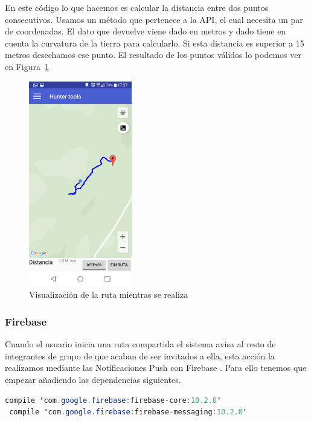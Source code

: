 En este código lo que hacemos es calcular la distancia entre dos puntos consecutivos. Usamos un método que pertenece a la API,  el cual necesita un par de coordenadas. El dato que devuelve viene dado en metros y  dado tiene en cuenta la curvatura de la tierra para calcularlo. Si esta distancia es superior a 15 metros desechamos ese punto. El resultado de los puntos válidos lo podemos ver en  Figura~\ref{fig:individual-navegacion2}

\begin{figure}
		\centering
		\includegraphics[width=0.4\textwidth] {capturamovil/individual-navegacion.png}
		\caption{Visualización de la ruta mientras se realiza}
		\label{fig:individual-navegacion2}
	\end{figure}
	
\subsubsection{Firebase} 
Cuando el usuario inicia una ruta compartida el sistema avisa al resto de integrantes de grupo de que acaban de ser invitados a ella, esta acción la realizamos mediante las Notificaciones Push con Firebase \cite{7}. Para ello tenemos que empezar añadiendo las dependencias siguientes.

	\begin{lstlisting}[language=java,caption={Dependencia de Firebase en gradle},label=DescriptiveLabel]
 compile 'com.google.firebase:firebase-core:10.2.0'
 compile 'com.google.firebase:firebase-messaging:10.2.0'

\end{lstlisting}
	
